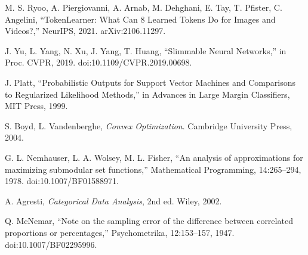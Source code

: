 \begin{thebibliography}{99}
M. S. Ryoo, A. Piergiovanni, A. Arnab, M. Dehghani, E. Tay, T. Pfister, C. Angelini, ``TokenLearner: What Can 8 Learned Tokens Do for Images and Videos?,'' NeurIPS, 2021. arXiv:2106.11297.

J. Yu, L. Yang, N. Xu, J. Yang, T. Huang, ``Slimmable Neural Networks,'' in Proc. CVPR, 2019. doi:10.1109/CVPR.2019.00698.

J. Platt, ``Probabilistic Outputs for Support Vector Machines and Comparisons to Regularized Likelihood Methods,'' in Advances in Large Margin Classifiers, MIT Press, 1999.

S. Boyd, L. Vandenberghe, \emph{Convex Optimization}. Cambridge University Press, 2004.

G. L. Nemhauser, L. A. Wolsey, M. L. Fisher, ``An analysis of approximations for maximizing submodular set functions,'' Mathematical Programming, 14:265--294, 1978. doi:10.1007/BF01588971.

A. Agresti, \emph{Categorical Data Analysis}, 2nd ed. Wiley, 2002.

Q. McNemar, ``Note on the sampling error of the difference between correlated proportions or percentages,'' Psychometrika, 12:153--157, 1947. doi:10.1007/BF02295996.

\end{thebibliography}

